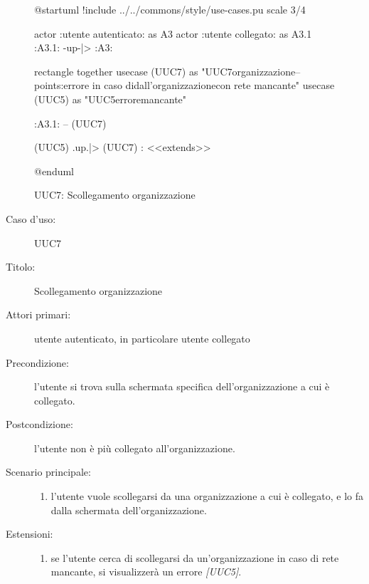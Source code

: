 \documentclass[../../../analisi-dei-requisiti.tex]{subfiles}
\begin{document}
\begin{figure}[h!]
  \centering
  \begin{plantuml}
  @startuml
  !include ../../commons/style/use-cases.pu
  scale 3/4

  actor :utente autenticato: as A3
  actor :utente collegato: as A3.1
  :A3.1: -up-|> :A3:

  rectangle {
    together {
      usecase (UUC7) as "UUC7\nScollegamento organizzazione\n--\nExtension points:\nVisualizzazione errore in caso di\nscollegamento dall'organizzazione\n con rete mancante"
      usecase (UUC5) as "UUC5\nVisualizzazione errore\nrete mancante"
    }
  }

  :A3.1: -- (UUC7)

  (UUC5) .up.|> (UUC7) : <<extends>>

  @enduml
    \end{plantuml}
  \caption{UUC7: Scollegamento organizzazione}
  \label{fig:uuc7}
\end{figure}

\begin{description}
  \item[Caso d’uso:] UUC7
  \item[Titolo:] Scollegamento organizzazione
  \item[Attori primari:] utente autenticato, in particolare utente collegato
  \item[Precondizione:] l'utente si trova sulla schermata specifica dell'organizzazione a cui è collegato.
  \item[Postcondizione:] l'utente non è più collegato all'organizzazione.
  \item[Scenario principale:]
        \begin{enumerate}
          \item l'utente vuole scollegarsi da una organizzazione a cui è collegato, e lo fa dalla schermata dell'organizzazione.
        \end{enumerate}
  \item[Estensioni:]
        \begin{enumerate}
          \item se l'utente cerca di scollegarsi da un'organizzazione in caso di rete mancante, si visualizzerà un errore \emph{[UUC5]}.
        \end{enumerate}
\end{description}
\end{document}
